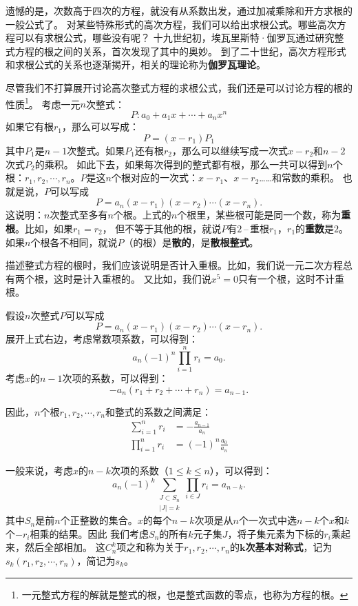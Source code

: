 \documentclass[12pt,UTF8]{ctexbook}
\newcommand{\dash}{\,–\,}
\theoremstyle{definition}
\theoremstyle{plain}
\begin{document}
遗憾的是，次数高于四次的方程，就没有从系数出发，通过加减乘除和开方求根的一般公式了。
对某些特殊形式的高次方程，我们可以给出求根公式。哪些高次方程可以有求根公式，哪些没有呢？
十九世纪初，埃瓦里斯特·伽罗瓦通过研究整式方程的根之间的关系，首次发现了其中的奥妙。
到了二十世纪，高次方程形式和求根公式的关系也逐渐揭开，相关的理论称为\textbf{伽罗瓦理论}。

尽管我们不打算展开讨论高次整式方程的求根公式，我们还是可以讨论方程的根的性质\footnote{一元整式方程的解就是整式的根，也是整式函数的零点，也称为方程的根。}。
考虑一元$n$次整式：
$$ P: a_0 + a_1 x + \cdots + a_n x^n $$
如果它有根$r_1$，那么可以写成：
$$ P = (x - r_1) P_1$$
其中$P_1$是$n-1$次整式。如果$P_1$还有根$r_2$，那么可以继续写成一次式$x - r_2$和$n-2$次式$P_2$的乘积。
如此下去，如果每次得到的整式都有根，那么一共可以得到$n$个根：$r_1, r_2, \cdots , r_n$。$P$是这$n$个根对应的一次式：$x - r_1$、$x - r_2$……和常数的乘积。
也就是说，$P$可以写成
$$ P = a_n (x - r_1)(x - r_2)\cdots (x - r_n).$$
这说明：$n$次整式至多有$n$个根。上式的$n$个根里，某些根可能是同一个数，称为\textbf{重根}。比如，如果$r_1 = r_2$，
但不等于其他的根，就说$P$有$2$\dash 重根$r_1$，$r_1$的\textbf{重数}是$2$。如果$n$个根各不相同，就说$P$（的根）是\textbf{散的}，是\textbf{散根整式}。

描述整式方程的根时，我们应该说明是否计入重根。比如，我们说一元二次方程总有两个根，这时是计入重根的。
又比如，我们说$x^5 = 0$只有一个根，这时不计重根。

假设$n$次整式$P$可以写成
$$ P = a_n (x - r_1)(x - r_2)\cdots (x - r_n).$$
展开上式右边，考虑常数项系数，可以得到：
$$ a_n (-1)^n \prod_{i=1}^n r_i = a_0.$$
考虑$x$的$n-1$次项的系数，可以得到：
$$ - a_n (r_1 + r_2 + \cdots + r_n) = a_{n-1}. $$

因此，$n$个根$r_1, r_2, \cdots , r_n$和整式的系数之间满足：
\begin{align*}
    \sum_{i=1}^n r_i &= -\frac{a_{n-1}}{a_n} \\
    \prod_{i=1}^n r_i &= (-1)^n \frac{a_0}{a_n}
\end{align*}

一般来说，考虑$x$的$n-k$次项的系数（$1\leqslant k \leqslant n$），可以得到：
$$ a_n (-1)^k \sum_{\substack{J\subset S_n\\|J|=k}} \prod_{i\in J}r_{i} = a_{n-k}. $$
其中$S_n$是前$n$个正整数的集合。$x$的每个$n-k$次项是从$n$个一次式中选$n-k$个$x$和$k$个$-r_i$相乘的结果。因此
我们考虑$S_n$的所有$k$元子集$J$，将子集元素为下标的$r_i$乘起来，然后全部相加。
这$C_n^k$项之和称为关于$r_1, r_2, \cdots , r_n$的$\boldsymbol{k}$\textbf{次基本对称式}，记为$s_{k}(r_1, r_2, \cdots , r_n)$，简记为$s_k$。
\end{document}
